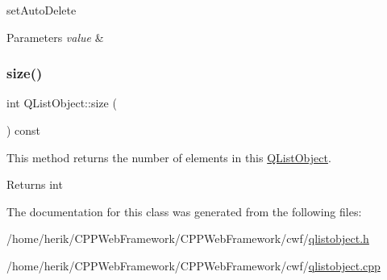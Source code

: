 set\+Auto\+Delete 


\begin{DoxyParams}{Parameters}
{\em value} & \\
\hline
\end{DoxyParams}
\mbox{\label{class_q_list_object_a4ded55097ea08fa5781240883a591216}} 
\subsubsection{\texorpdfstring{size()}{size()}}
{\footnotesize\ttfamily int Q\+List\+Object\+::size (\begin{DoxyParamCaption}{ }\end{DoxyParamCaption}) const}



This method returns the number of elements in this \hyperlink{class_q_list_object}{Q\+List\+Object}. 

\begin{DoxyReturn}{Returns}
int 
\end{DoxyReturn}


The documentation for this class was generated from the following files\+:\begin{DoxyCompactItemize}
\item 
/home/herik/\+C\+P\+P\+Web\+Framework/\+C\+P\+P\+Web\+Framework/cwf/\hyperlink{qlistobject_8h}{qlistobject.\+h}\item 
/home/herik/\+C\+P\+P\+Web\+Framework/\+C\+P\+P\+Web\+Framework/cwf/\hyperlink{qlistobject_8cpp}{qlistobject.\+cpp}\end{DoxyCompactItemize}
